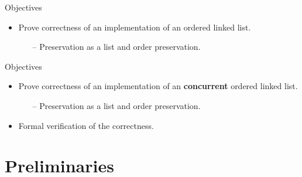 \documentclass[10pt,notes,compress,usetitleprogressbar,aspectratio=1610]{beamer}
\begin{document}
\begin{frame}{Objectives}
\begin{itemize}
	\item Prove correctness of an implementation of an ordered linked list.
	\begin{itemize}
		\item[--] Preservation as a list and order preservation.
	\end{itemize}
	\begin{figure}
		
	\end{figure}
	\item[]
	\item[]
\end{itemize}
\end{frame}

\begin{frame}{Objectives}
\begin{itemize}
	\item Prove correctness of an implementation of an \textbf{concurrent} ordered linked list.
	\begin{itemize}
		\item[--] Preservation as a list and order preservation.
	\end{itemize}
	\begin{figure}
		
	\end{figure}
	\item Formal verification of the correctness.
	
\end{itemize}
\end{frame}

\section{Preliminaries}
\end{document}
